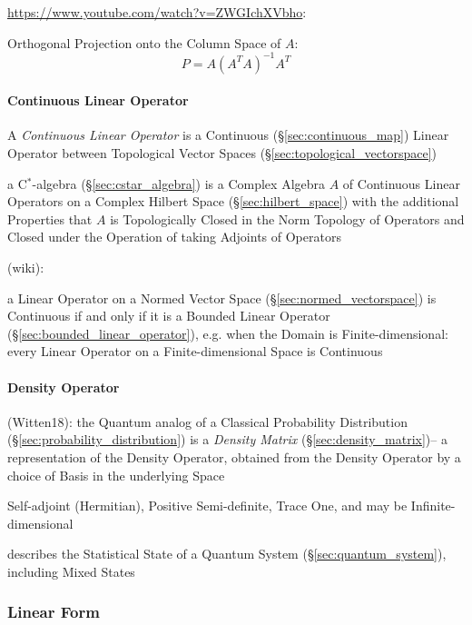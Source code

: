 \url{https://www.youtube.com/watch?v=ZWGIchXVbho}:

Orthogonal Projection onto the Column Space of $A$:
\[
  P = A(A^TA)^{-1}A^T
\]



\paragraph{Continuous Linear Operator}\label{sec:continuous_linear}\hfill

A \emph{Continuous Linear Operator} is a Continuous
(\S\ref{sec:continuous_map}) Linear Operator between Topological
Vector Spaces (\S\ref{sec:topological_vectorspace})

a C$^*$-algebra (\S\ref{sec:cstar_algebra}) is a Complex Algebra $A$
of Continuous Linear Operators on a Complex Hilbert Space
(\S\ref{sec:hilbert_space}) with the additional Properties that $A$ is
Topologically Closed in the Norm Topology of Operators and Closed
under the Operation of taking Adjoints of Operators

(wiki):

a Linear Operator on a Normed Vector Space
(\S\ref{sec:normed_vectorspace}) is Continuous if and only if it is a
Bounded Linear Operator (\S\ref{sec:bounded_linear_operator}), e.g.
when the Domain is Finite-dimensional: every Linear Operator on a
Finite-dimensional Space is Continuous



\paragraph{Density Operator}\label{sec:density_operator}\hfill

(Witten18): the Quantum analog of a Classical Probability Distribution
(\S\ref{sec:probability_distribution}) is a \emph{Density Matrix}
(\S\ref{sec:density_matrix})-- a representation of the Density Operator,
obtained from the Density Operator by a choice of Basis in the underlying Space

Self-adjoint (Hermitian), Positive Semi-definite, Trace One, and may be
Infinite-dimensional

describes the Statistical State of a Quantum System
(\S\ref{sec:quantum_system}), including Mixed States



\subsubsection{Linear Form}\label{sec:linear_form}

